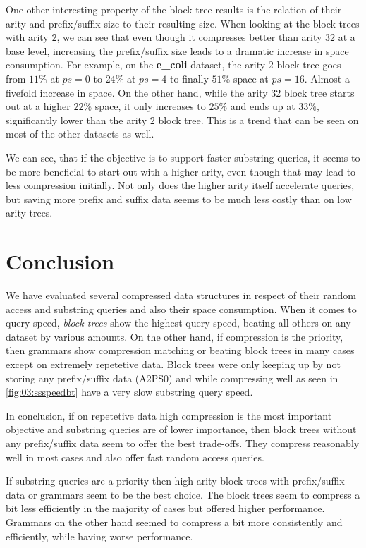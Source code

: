\documentclass{scrartcl}
\begin{document}
One other interesting property of the block tree results is the relation of their arity and prefix/suffix size to their resulting size.
When looking at the block trees with arity $2$, we can see that even though it compresses better than arity $32$ at a base level,
increasing the prefix/suffix size leads to a dramatic increase in space consumption.
For example, on the \textbf{e\_coli} dataset, the arity $2$ block tree goes from $11\%$ at $ps = 0$ to $24\%$ at $ps=4$ to finally $51\%$ space at $ps=16$.
Almost a fivefold increase in space.
On the other hand, while the arity $32$ block tree starts out at a higher $22\%$ space, it only increases to $25\%$ and ends up at $33\%$, significantly lower than the arity $2$ block tree.
This is a trend that can be seen on most of the other datasets as well.

We can see, that if the objective is to support faster substring queries, it seems to be more beneficial to start out with a higher arity, even though that may lead to less compression initially.
Not only does the higher arity itself accelerate queries, but saving more prefix and suffix data seems to be much less costly than on low arity trees.

\section{Conclusion}

We have evaluated several compressed data structures in respect of their random access and substring queries and also their space consumption.
When it comes to query speed, \emph{block trees} show the highest query speed, beating all others on any dataset by various amounts.
On the other hand, if compression is the priority, then grammars show compression matching or beating block trees in many cases except on extremely repetetive data.
Block trees were only keeping up by not storing any prefix/suffix data (A2PS0) and while compressing well as seen in \cref{fig:03:ssspeedbt} have a very slow substring query speed.

In conclusion, if on repetetive data high compression is the most important objective and substring queries are of lower importance,
then block trees without any prefix/suffix data seem to offer the best trade-offs.
They compress reasonably well in most cases and also offer fast random access queries.

If substring queries are a priority then high-arity block trees with prefix/suffix data or grammars seem to be the best choice.
The block trees seem to compress a bit less efficiently in the majority of cases but offered higher performance.
Grammars on the other hand seemed to compress a bit more consistently and efficiently, while having worse performance.


\end{document}
